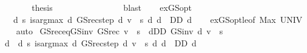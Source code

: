 \begin{isabellebody}
\ \ \ \ \isamarkupfalse%
\ \isamarkupfalse%
\ {\isacharquery}{\kern0pt}thesis\isanewline
\ \ \ \ \ \ \isamarkupfalse%
\ {}\isanewline
\ \ \ \ \ \ \isamarkupfalse%
\ blast\isanewline
\ \ \isamarkupfalse%
\isanewline
{}\isamarkupfalse%
%
\endisatagproof
{\isafoldproof}%
%
\isadelimproof
\isanewline
%
\endisadelimproof
\isanewline
{}\isamarkupfalse%
\ ex{\isacharunderscore}{\kern0pt}GS{\isacharunderscore}{\kern0pt}opt{\isacharcolon}{\kern0pt}\isanewline
\ \ \ {\isachardoublequoteopen}{\isasymexists}d{\isachardot}{\kern0pt}\ {\isasymforall}s{\isachardot}{\kern0pt}\ is{\isacharunderscore}{\kern0pt}arg{\isacharunderscore}{\kern0pt}max\ {\isacharparenleft}{\kern0pt}{\isasymlambda}d{\isachardot}{\kern0pt}\ GS{\isacharunderscore}{\kern0pt}rec{\isacharunderscore}{\kern0pt}step\ d\ v\ {\isachardollar}{\kern0pt}\ s{\isacharparenright}{\kern0pt}\ {\isacharparenleft}{\kern0pt}{\isasymlambda}d{\isachardot}{\kern0pt}\ d\ {\isasymin}\ D\isactrlsub D{\isacharparenright}{\kern0pt}\ d{\isachardoublequoteclose}\isanewline
%
\isadelimproof
\ \ %
\endisadelimproof
%
\isatagproof
{}\isamarkupfalse%
\ ex{\isacharunderscore}{\kern0pt}GS{\isacharunderscore}{\kern0pt}opt{\isacharunderscore}{\kern0pt}le{\isacharbrackleft}{\kern0pt}of\ {\isachardoublequoteopen}Max\ UNIV{\isachardoublequoteclose}{\isacharbrackright}{\kern0pt}\isanewline
\ \ \isamarkupfalse%
\ auto%
\endisatagproof
{\isafoldproof}%
%
\isadelimproof
\isanewline
%
\endisadelimproof
\isanewline
{}\isamarkupfalse%
\ GS{\isacharunderscore}{\kern0pt}rec{\isacharunderscore}{\kern0pt}eq{\isacharunderscore}{\kern0pt}GS{\isacharunderscore}{\kern0pt}inv{\isacharprime}{\kern0pt}{\isacharcolon}{\kern0pt}\ {\isachardoublequoteopen}GS{\isacharunderscore}{\kern0pt}rec\ v\ {\isachardollar}{\kern0pt}\ s\ {\isacharequal}{\kern0pt}\ {\isacharparenleft}{\kern0pt}{\isasymSqunion}d{\isasymin}D\isactrlsub D{\isachardot}{\kern0pt}\ GS{\isacharunderscore}{\kern0pt}inv\ d\ v\ {\isachardollar}{\kern0pt}\ s{\isacharparenright}{\kern0pt}{\isachardoublequoteclose}\isanewline
%
\isadelimproof
%
\endisadelimproof
%
\isatagproof
{}\isamarkupfalse%
\ {\isacharminus}{\kern0pt}\isanewline
\ \ \isamarkupfalse%
\ d\ \ d{\isacharcolon}{\kern0pt}\ {\isachardoublequoteopen}{\isacharparenleft}{\kern0pt}{\isasymAnd}s{\isachardot}{\kern0pt}\ is{\isacharunderscore}{\kern0pt}arg{\isacharunderscore}{\kern0pt}max\ {\isacharparenleft}{\kern0pt}{\isasymlambda}d{\isachardot}{\kern0pt}\ GS{\isacharunderscore}{\kern0pt}rec{\isacharunderscore}{\kern0pt}step\ d\ v\ {\isachardollar}{\kern0pt}\ s{\isacharparenright}{\kern0pt}\ {\isacharparenleft}{\kern0pt}{\isasymlambda}d{\isachardot}{\kern0pt}\ d\ {\isasymin}\ D\isactrlsub D{\isacharparenright}{\kern0pt}\ d{\isacharparenright}{\kern0pt}{\isachardoublequoteclose}\isanewline

\end{isabellebody}
